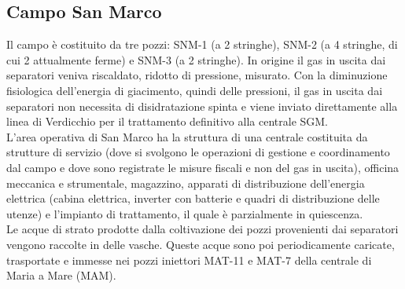 \subsection{Campo San Marco}
Il campo è costituito da tre pozzi: SNM-1 (a 2 stringhe), SNM-2 (a 4 stringhe, di cui 2 attualmente ferme) e SNM-3 (a 2 stringhe).
In origine il gas in uscita dai separatori veniva riscaldato, ridotto di pressione, misurato. Con la diminuzione fisiologica dell'energia di giacimento, quindi delle pressioni, il gas in uscita dai separatori non necessita di disidratazione spinta e viene inviato direttamente alla linea di Verdicchio per il trattamento definitivo alla centrale SGM.\\
L'area operativa di San Marco ha la struttura di una centrale costituita da strutture di servizio (dove si svolgono le operazioni di gestione e coordinamento dal campo e dove sono registrate le misure fiscali e non del gas in uscita), officina meccanica e strumentale, magazzino, apparati di distribuzione dell'energia elettrica (cabina elettrica, inverter con batterie e quadri di distribuzione delle utenze) e l'impianto di trattamento, il quale è parzialmente in quiescenza.\\
Le acque di strato prodotte dalla coltivazione dei pozzi provenienti dai separatori vengono raccolte in delle vasche. Queste acque sono poi periodicamente caricate, trasportate e immesse nei pozzi iniettori MAT-11 e MAT-7 della centrale di Maria a Mare (MAM).

